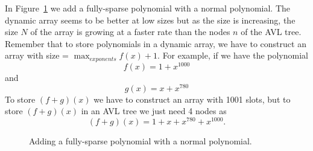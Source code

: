 \documentclass[journal,article,submit,moreauthors,algorithms]{Definitions/mdpi}
\begin{document}
In Figure~\ref{fig:4} we add a fully-sparse polynomial with a normal polynomial. The dynamic array seems to be better at low sizes but as the size is increasing, the size $N$ of the array is growing at a faster rate than the nodes $n$ of the AVL tree. Remember that to store polynomials in a dynamic array, we have to construct an array with size = $\max_{exponents} f(x) + 1$. For example, if we have the polynomial 
\[
f(x) = 1 + x^{1000}
\] 
and 
\[
g(x) = x + x^{780}
\]
To store $(f+g)(x)$ we have to construct an array with 1001 slots, but to store $(f+g)(x)$ in an AVL tree we just need 4 nodes as 
\[
(f+g)(x) = 1 + x + x^{780} + x^{1000}.
\]
\begin{figure}[H]
\centering
{}
\hfil
{}
\caption{Adding a fully-sparse polynomial with a normal polynomial.}
\label{fig:4}
\end{figure} 
\end{document}
